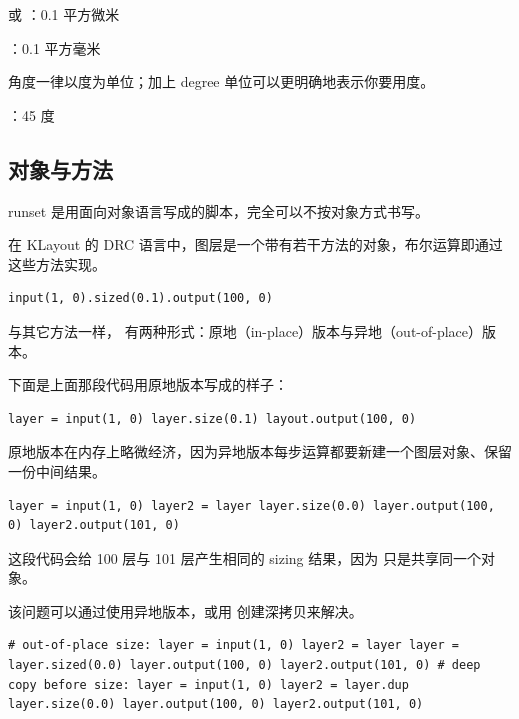 \begin{kldesc}
\item {} 或 ：0.1 平方微米
\item {}：0.1 平方毫米
\end{kldesc}

角度一律以度为单位；加上 degree 单位可以更明确地表示你要用度。

\begin{kldesc}
\item {}：45 度
\end{kldesc}

\subsection{对象与方法}

runset 是用面向对象语言写成的脚本，完全可以不按对象方式书写。

在 KLayout 的 DRC 语言中，图层是一个带有若干方法的对象，布尔运算即通过这些方法实现。

\begin{lstlisting}
input(1, 0).sized(0.1).output(100, 0)
\end{lstlisting}

与其它方法一样， 有两种形式：原地（in-place）版本与异地（out-of-place）版本。

下面是上面那段代码用原地版本写成的样子：

\begin{lstlisting}
layer = input(1, 0) layer.size(0.1) layout.output(100, 0)
\end{lstlisting}

原地版本在内存上略微经济，因为异地版本每步运算都要新建一个图层对象、保留一份中间结果。

\begin{lstlisting}
layer = input(1, 0) layer2 = layer layer.size(0.0) layer.output(100, 0) layer2.output(101, 0)
\end{lstlisting}

这段代码会给 100 层与 101 层产生相同的 sizing 结果，因为  只是共享同一个对象。

该问题可以通过使用异地版本，或用  创建深拷贝来解决。

\begin{lstlisting}
# out-of-place size: layer = input(1, 0) layer2 = layer layer = layer.sized(0.0) layer.output(100, 0) layer2.output(101, 0) # deep copy before size: layer = input(1, 0) layer2 = layer.dup layer.size(0.0) layer.output(100, 0) layer2.output(101, 0)
\end{lstlisting}

